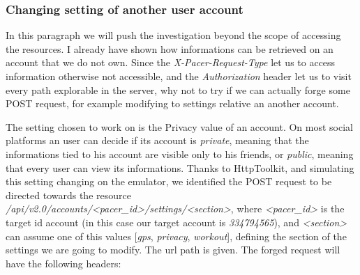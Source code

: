 		\subsubsection{Changing setting of another user account}
			\par In this paragraph we will push the investigation beyond the scope of accessing the resources. I already have shown how informations can be retrieved on an account that we do not own. Since the \textit{X-Pacer-Request-Type} let us to access information otherwise not accessible, and the \textit{Authorization} header let us to visit every path explorable in the server, why not to try if we can actually forge some POST request, for example modifying to settings relative an another account.\newline
			\par The setting chosen to work on is the Privacy value of an account. On most social platforms an user can decide if its account is \textit{private}, meaning that the informations tied to his account are visible only to his friends, or \textit{public}, meaning that every user can view its informations. Thanks to HttpToolkit, and simulating this setting changing on the emulator, we identified the POST request to be directed towards the resource \textit{/api/v2.0/accounts/<pacer\_id>/settings/<section>}, where \textit{<pacer\_id>} is the target id account (in this case our target account is \textit{334794565}), and \textit{<section>} can assume one of this values [\textit{gps}, \textit{privacy}, \textit{workout}], defining the section of the settings we are going to modify. \newline
			The url path is given. The forged request will have the following headers:
